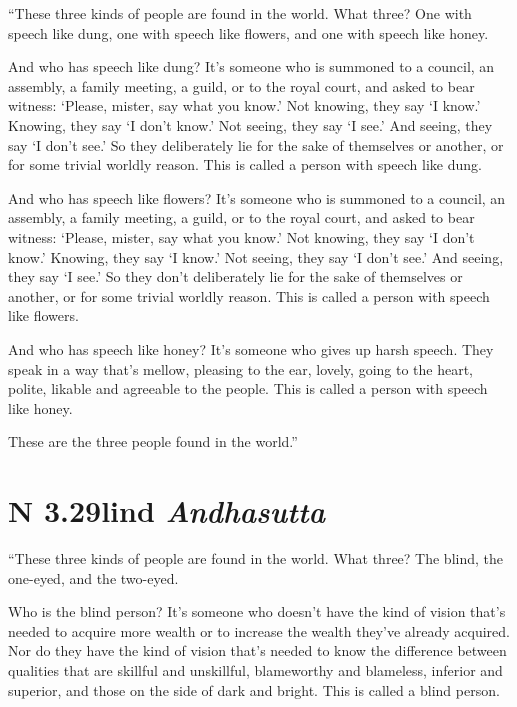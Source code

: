 \documentclass[12pt,openany]{book}%
\newcommand*{\suttatitleacronym}[1]{\smaller[2]{#1}\vspace*{.3em}}
\newcommand*{\suttatitletranslation}[1]{\linebreak{#1}}
\newcommand*{\suttatitleroot}[1]{\linebreak\smaller[2]\itshape{#1}}
\newcommand*{\tocacronym}[1]{\hspace*{-3.3em}{#1}\quad}
\newcommand*{\toctranslation}[1]{#1}
\newcommand*{\tocroot}[1]{(\textit{#1})}
\begin{document}
“These three kinds of people are found in the world. What three? One with speech like dung, one with speech like flowers, and one with speech like honey. 

And who has speech like dung? It’s someone who is summoned to a council, an assembly, a family meeting, a guild, or to the royal court, and asked to bear witness: ‘Please, mister, say what you know.’ Not knowing, they say ‘I know.’ Knowing, they say ‘I don’t know.’ Not seeing, they say ‘I see.’ And seeing, they say ‘I don’t see.’ So they deliberately lie for the sake of themselves or another, or for some trivial worldly reason. This is called a person with speech like dung. 

And who has speech like flowers? It’s someone who is summoned to a council, an assembly, a family meeting, a guild, or to the royal court, and asked to bear witness: ‘Please, mister, say what you know.’ Not knowing, they say ‘I don’t know.’ Knowing, they say ‘I know.’ Not seeing, they say ‘I don’t see.’ And seeing, they say ‘I see.’ So they don’t deliberately lie for the sake of themselves or another, or for some trivial worldly reason. This is called a person with speech like flowers. 

And who has speech like honey? It’s someone who gives up harsh speech. They speak in a way that’s mellow, pleasing to the ear, lovely, going to the heart, polite, likable and agreeable to the people. This is called a person with speech like honey. 

These are the three people found in the world.” 

%
\section*{{\suttatitleacronym AN 3.29}{\suttatitletranslation Blind }{\suttatitleroot Andhasutta}}
\addcontentsline{toc}{section}{\tocacronym{AN 3.29} \toctranslation{Blind } \tocroot{Andhasutta}}

“These three kinds of people are found in the world. What three? The blind, the one-eyed, and the two-eyed. 

Who is the blind person? It’s someone who doesn’t have the kind of vision that’s needed to acquire more wealth or to increase the wealth they’ve already acquired. Nor do they have the kind of vision that’s needed to know the difference between qualities that are skillful and unskillful, blameworthy and blameless, inferior and superior, and those on the side of dark and bright. This is called a blind person. 
\end{document}
